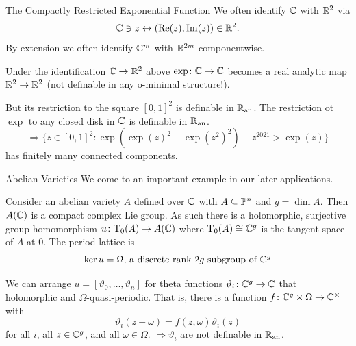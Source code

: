 \documentclass{beamer}
\begin{document}
\begin{frame}{The Compactly Restricted Exponential Function}
  We often identify ${\mathbb{C}}$ with ${\mathbb{R}}^2$ via
  \begin{equation*}
    {\mathbb{C}}\ni z\leftrightarrow (\mathrm{Re}(z),\mathrm{Im}(z))\in{\mathbb{R}}^2.
  \end{equation*}
  By extension we often
  identify ${\mathbb{C}}^m$ with ${\mathbb{R}}^{2m}$ componentwise.


  \begin{example}
    Under the identification
    ${\mathbb{C}}\rightarrow{\mathbb{R}}^2$  above
    $\exp\colon{\mathbb{C}}\rightarrow{\mathbb{C}}$ becomes a real analytic map
    ${\mathbb{R}}^2\rightarrow{\mathbb{R}}^2$ (\alert{not} definable in any
    o-minimal structure!).
    
    But its restriction to the square $[0,1]^2$ is definable in ${{\mathbb{R}}_{\mathrm{an}}}$.
    The restriction ot $\exp$ to any
    closed disk in ${\mathbb{C}}$ is definable in ${{\mathbb{R}}_{\mathrm{an}}}$.
    \begin{equation*}
      \Rightarrow\{z\in [0,1]^2 : \exp(\exp(z)^2-\exp(z^2)^2)-z^{2021} > \exp(z)\}
    \end{equation*}
    has finitely many connected components.
  \end{example}
\end{frame}

\begin{frame}{Abelian Varieties}
  We come to an important example in our later applications. 

  Consider an abelian variety $A$
  defined over ${\mathbb{C}}$ with $A\subseteq {\mathbb{P}}^n$ and $g=\dim A$.
  Then $A({\mathbb{C}})$ is a compact complex Lie group. As such there is a
  holomorphic, surjective group homomorphism $u\colon \mathrm{T}_0(A) \rightarrow
  A({\mathbb{C}})$
  where $\mathrm{T}_0(A)\cong {\mathbb{C}}^g$ is the tangent space of $A$ at
  $0$. The \alert{period lattice} is
  \begin{equation*}
    \ker u = \Omega\text{, a discrete rank $2g$ subgroup of ${\mathbb{C}}^g$}
  \end{equation*}
  

  We can arrange $u = [\vartheta_0,\ldots,\vartheta_n]$ for theta
  functions $\vartheta_i \colon {\mathbb{C}}^g \rightarrow{\mathbb{C}}$ that holomorphic
  and $\Omega$-quasi-periodic.
  That is, there is a function $f\colon {\mathbb{C}}^g\times \Omega\rightarrow
  {\mathbb{C}}^\times$ with 
  \begin{equation}
    \vartheta_i(z+\omega) = f(z,\omega) \vartheta_i(z)
  \end{equation}
  for all $i$, all $z\in{\mathbb{C}}^g$, and all $\omega\in\Omega$.
  $\Rightarrow \vartheta_i$ are \alert{not} definable in ${{\mathbb{R}}_{\mathrm{an}}}$. 
\end{frame}
\end{document}
